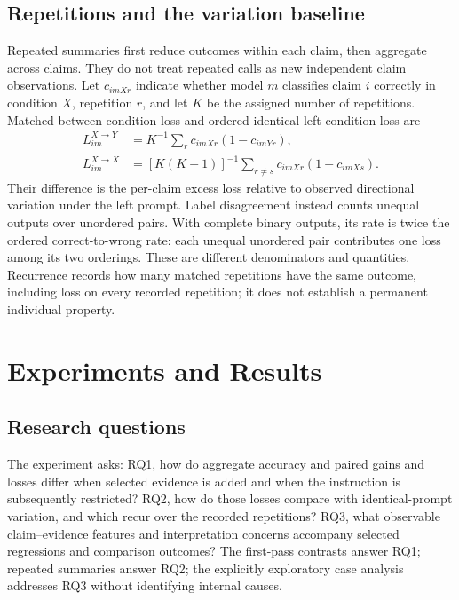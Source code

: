\documentclass[11pt,letterpaper]{article}
\begin{document}
\subsection{Repetitions and the variation baseline}\label{sec:repeat-method}
Repeated summaries first reduce outcomes within each claim, then aggregate across claims. They do not treat repeated calls as new independent claim observations. Let $c_{imXr}$ indicate whether model $m$ classifies claim $i$ correctly in condition $X$, repetition $r$, and let $K$ be the assigned number of repetitions. Matched between-condition loss and ordered identical-left-condition loss are
\begin{align}
L^{X\to Y}_{im}&=K^{-1}\sum_r c_{imXr}(1-c_{imYr}),\\
L^{X\to X}_{im}&=[K(K-1)]^{-1}\sum_{r\ne s}c_{imXr}(1-c_{imXs}).
\end{align}
Their difference is the per-claim excess loss relative to observed directional variation under the left prompt. Label disagreement instead counts unequal outputs over unordered pairs. With complete binary outputs, its rate is twice the ordered correct-to-wrong rate: each unequal unordered pair contributes one loss among its two orderings. These are different denominators and quantities. Recurrence records how many matched repetitions have the same outcome, including loss on every recorded repetition; it does not establish a permanent individual property.

\section{Experiments and Results}\label{sec:results}
\subsection{Research questions}
The experiment asks: RQ1, how do aggregate accuracy and paired gains and losses differ when selected evidence is added and when the instruction is subsequently restricted? RQ2, how do those losses compare with identical-prompt variation, and which recur over the recorded repetitions? RQ3, what observable claim--evidence features and interpretation concerns accompany selected regressions and comparison outcomes? The first-pass contrasts answer RQ1; repeated summaries answer RQ2; the explicitly exploratory case analysis addresses RQ3 without identifying internal causes.
\end{document}

